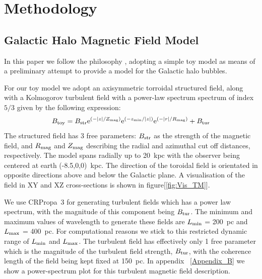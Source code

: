 \documentclass[12pt, a4 paper]{article}
\begin{document}
\section{Methodology}
\label{Methods}

\subsection{Galactic Halo Magnetic Field Model}
\label{GMF}
In this paper we follow the philosophy \cite{West_Helicity}, adopting a simple toy model as means of a preliminary attempt to provide a model for the Galactic halo bubbles. 

For our toy model we adopt an axisymmetric torroidal structured field, along with a Kolmogorov turbulent field with a power-law spectrum spectrum of index $5/3$ given by the following expression:
\begin{equation}\label{TM_equation}
        B_{\mathrm{toy}}= B_{\rm{str}}\mathrm{e}^{{(-\abs{{z}}/Z_{{\mathrm{mag}}})}} \mathrm{e}^{{(-z_{{\mathrm{min}}}/\abs{{z}})}}\mathrm{e}^{{(-\abs{{r}}/R_{{\mathrm{mag}}})}} + B_{\rm{tur}}
\end{equation}
The structured field has 3 free parameters: $B_{\rm str}$ as the strength of the magnetic field, and $R_{\rm {mag}}$ and $Z_{\rm {mag}}$ describing the radial and azimuthal cut off distances, respectively. The model spans radially up to 20~kpc with the observer being centered at earth (-8.5,0,0)~kpc. The direction of the toroidal field is orientated in opposite directions above and below the Galactic plane. A visualisation of the field in XY and XZ cross-sections is shown in figure[\ref{fig:Vis_TM}]. 

We use CRPropa~3 \cite{CRPropa3_2016} for generating turbulent fields which has a power law spectrum, with the magnitude of this component being $B_{\rm{tur}}$. 
The minimum and maximum values of wavelength to generate these fields are  $L_{\rm min}$ = 200~pc and $L_{\rm max}$ = 400~pc. For computational reasons we stick to this restricted dynamic range of $L_{\rm min}$ and $L_{\rm max}$. The turbulent field has effectively only 1 free parameter which is the magnitude of the turbulent field strength, $ B_{\rm tur}$, with the coherence length of the field being kept fixed at 150~pc.  In appendix ~\ref{Appendix_B} we show a power-spectrum plot for this turbulent magnetic field description.
\end{document}
